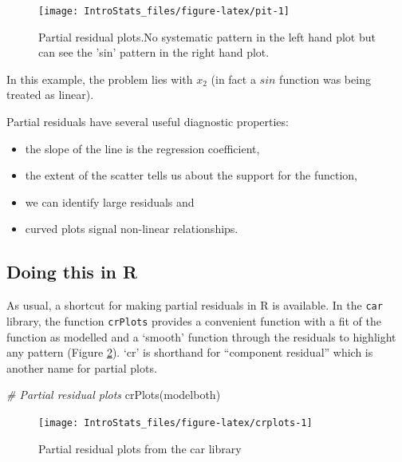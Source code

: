 \documentclass[
  oneside]{krantz}
\newenvironment{Shaded}{\begin{snugshade}}{\end{snugshade}}
\newcommand{\CommentTok}[1]{\textcolor[rgb]{0.56,0.35,0.01}{\textit{#1}}}
\newcommand{\FunctionTok}[1]{\textcolor[rgb]{0.00,0.00,0.00}{#1}}
\newcommand{\NormalTok}[1]{#1}
\providecommand{\tightlist}{%
  \setlength{\itemsep}{0pt}\setlength{\parskip}{0pt}}
\begin{document}
\begin{figure}

{\centering \texttt{[image: IntroStats\_files/figure-latex/pit-1]} 

}

\caption{Partial residual plots.No systematic pattern in the left hand plot but can see the 'sin' pattern in the right hand plot.}\label{fig:pit}
\end{figure}

In this example, the problem lies with \(x_2\) (in fact a \(sin\) function was being treated as linear).

Partial residuals have several useful diagnostic properties:

\begin{itemize}
\tightlist
\item
  the slope of the line is the regression coefficient,
\item
  the extent of the scatter tells us about the support for the function,
\item
  we can identify large residuals and
\item
  curved plots signal non-linear relationships.
\end{itemize}

\hypertarget{doing-this-in-r-30}{%
\subsection{Doing this in R}\label{doing-this-in-r-30}}

As usual, a shortcut for making partial residuals in R is available. In the \texttt{car} library, the function \texttt{crPlots} provides a convenient function with a fit of the function as modelled and a `smooth' function through the residuals to highlight any pattern (Figure \ref{fig:crplots}). `cr' is shorthand for ``component residual'' which is another name for partial plots.

\begin{Shaded}
\begin{Highlighting}[]
\CommentTok{\# Partial residual plots}
\FunctionTok{crPlots}\NormalTok{(modelboth)}
\end{Highlighting}
\end{Shaded}

\begin{figure}

{\centering \texttt{[image: IntroStats\_files/figure-latex/crplots-1]} 

}

\caption{Partial residual plots from the car library}\label{fig:crplots}
\end{figure}
\end{document}
